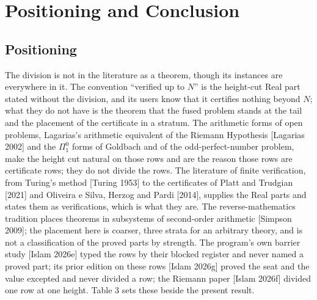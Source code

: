 \documentclass[10pt,twocolumn]{article}
\begin{document}
\hypertarget{positioning-and-conclusion}{%
\section{Positioning and Conclusion}\label{positioning-and-conclusion}}

\hypertarget{positioning}{%
\subsection{Positioning}\label{positioning}}

The division is not in the literature as a theorem, though its instances
are everywhere in it. The convention ``verified up to \(N\)'' is the
height-cut Real part stated without the division, and its users know
that it certifies nothing beyond \(N\); what they do not have is the
theorem that the fused problem stands at the tail and the placement of
the certificate in a stratum. The arithmetic forms of open problems,
Lagarias's arithmetic equivalent of the Riemann Hypothesis {[}Lagarias
2002{]} and the \(\Pi^0_1\) forms of Goldbach and of the
odd-perfect-number problem, make the height cut natural on those rows
and are the reason those rows are certificate rows; they do not divide
the rows. The literature of finite verification, from Turing's method
{[}Turing 1953{]} to the certificates of Platt and Trudgian {[}2021{]}
and Oliveira e Silva, Herzog and Pardi {[}2014{]}, supplies the Real
parts and states them as verifications, which is what they are. The
reverse-mathematics tradition places theorems in subsystems of
second-order arithmetic {[}Simpson 2009{]}; the placement here is
coarser, three strata for an arbitrary theory, and is not a
classification of the proved parts by strength. The program's own
barrier study {[}Islam 2026e{]} typed the rows by their blocked register
and never named a proved part; its prior edition on these rows {[}Islam
2026g{]} proved the seat and the value excepted and never divided a row;
the Riemann paper {[}Islam 2026f{]} divided one row at one height. Table
3 sets these beside the present result.
\end{document}
